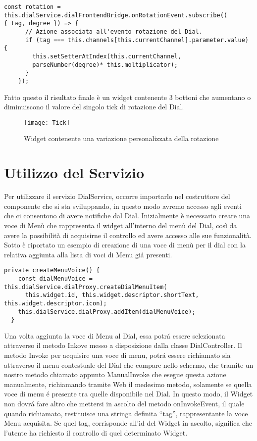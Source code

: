 \vspace{1.0cm}
\begin{lstlisting}[caption={Utilizzo del moltiplicatore},style=javaScriptCode]
const rotation = 
this.dialService.dialFrontendBridge.onRotationEvent.subscribe((
{ tag, degree }) => {
      // Azione associata all'evento rotazione del Dial.
      if (tag === this.channels[this.currentChannel].parameter.value) {
        this.setSetterAtIndex(this.currentChannel, 
        parseNumber(degree)* this.moltiplicator);
      }
    });
\end{lstlisting} 
\vspace{1.0cm}
Fatto questo il risultato finale è un widget contenente 3 bottoni che aumentano o diminuiscono il valore del singolo tick di rotazione del Dial.
\begin{figure}[htpb!]
\center
  \texttt{[image: Tick]}
  \caption{Widget contenente una variazione personalizzata della rotazione}
\end{figure}

\section{Utilizzo del Servizio}

Per utilizzare il servizio DialService, occorre importarlo nel costruttore del componente che si sta sviluppando, in questo modo avremo accesso agli eventi che ci consentono di avere notifiche dal Dial.
Inizialmente è necessario creare una voce di Menù che rappresenta il widget all’interno del menù del Dial, così da avere la possibilità di acquisirne il controllo ed avere accesso alle sue funzionalità.
Sotto è riportato un esempio di creazione di una voce di menù per il dial con la relativa aggiunta alla lista di voci di Menu giá presenti.

\vspace{1.0cm}
\begin{lstlisting}[caption={Creazione nuova voce da widget},style=javaScriptCode]
  private createMenuVoice() {
    const dialMenuVoice = this.dialService.dialProxy.createDialMenuItem(
      this.widget.id, this.widget.descriptor.shortText, this.widget.descriptor.icon);
    this.dialService.dialProxy.addItem(dialMenuVoice);
  }
\end{lstlisting} 
\vspace{1.0cm}

Una volta aggiunta la voce di Menu al Dial, essa potrá essere selezionata attraverso il metodo Inkove messo a disposizione dalla classe DialController. Il metodo Invoke per acquisire una voce di menu, potrá essere richiamato sia attraverso il menu contestuale del Dial che compare nello schermo, che tramite un nostro metodo chiamato appunto ManualInvoke che esegue questa azione manualmente, richiamando tramite Web il medesimo metodo, solamente se quella voce di menu é presente tra quelle disponibile nel Dial.
In questo modo, il Widget non dovrá fare altro che mettersi in ascolto del metodo onInvokeEvent, il quale quando richiamato, restituisce una stringa definita “tag”, rappresentante la voce Menu acquisita.
Se quel tag, corrisponde all’id del Widget in ascolto, significa che l’utente ha richiesto il controllo di quel determinato Widget.

